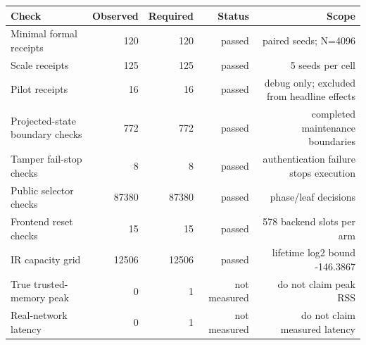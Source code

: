 \begin{tabular}{lrrrr}
\toprule
Check & Observed & Required & Status & Scope \\
\midrule
Minimal formal receipts & 120 & 120 & passed & paired seeds; N=4096 \\
Scale receipts & 125 & 125 & passed & 5 seeds per cell \\
Pilot receipts & 16 & 16 & passed & debug only; excluded from headline effects \\
Projected-state boundary checks & 772 & 772 & passed & completed maintenance boundaries \\
Tamper fail-stop checks & 8 & 8 & passed & authentication failure stops execution \\
Public selector checks & 87380 & 87380 & passed & phase/leaf decisions \\
Frontend reset checks & 15 & 15 & passed & 578 backend slots per arm \\
IR capacity grid & 12506 & 12506 & passed & lifetime log2 bound -146.3867 \\
True trusted-memory peak & 0 & 1 & not measured & do not claim peak RSS \\
Real-network latency & 0 & 1 & not measured & do not claim measured latency \\
\bottomrule
\end{tabular}
